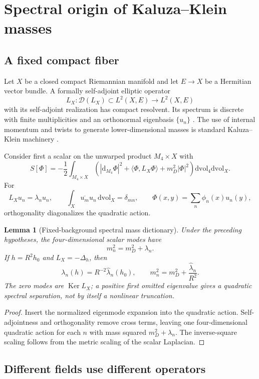 \documentclass[11pt]{article}
\newtheorem{lemma}[theorem]{Lemma}
\theoremstyle{definition}
\theoremstyle{remark}
\newcommand{\dd}{\mathrm d}
\newcommand{\cD}{\mathcal D}
\newcommand{\Ker}{\operatorname{Ker}}
\begin{document}
\section{Spectral origin of Kaluza--Klein masses}
\label{sec:spectrum}

\subsection{A fixed compact fiber}

Let \(X\) be a closed compact Riemannian manifold and let \(E\to X\) be a
Hermitian vector bundle.  A formally self-adjoint elliptic operator
\[
 L_X:\cD(L_X)\subset L^2(X,E)\longrightarrow L^2(X,E)
\]
with its self-adjoint realization has compact resolvent.  Its spectrum is
discrete with finite multiplicities and an orthonormal eigenbasis
\(\{u_n\}\) \cite{Chavel1984,ReedSimonIV}.  The use of internal momentum and
twists to generate lower-dimensional masses is standard Kaluza--Klein
machinery \cite{ScherkSchwarz1979}.

Consider first a scalar on the unwarped product \(M_4\times X\) with
\[
 S[\Phi]=-\frac12\int_{M_4\times X}
 \left(
 |\dd_{M_4}\Phi|^2
 +\langle\Phi,L_X\Phi\rangle
 +m_D^2|\Phi|^2
 \right)\dd\mathrm{vol}_{4}\dd\mathrm{vol}_{X}.
\]
For
\[
 L_Xu_n=\lambda_nu_n,\qquad
 \int_X\overline{u_m}u_n\,\dd\mathrm{vol}_{X}=\delta_{mn},
\qquad
 \Phi(x,y)=\sum_n\phi_n(x)u_n(y),
\]
orthogonality diagonalizes the quadratic action.

\begin{lemma}[Fixed-background spectral mass dictionary]
\label{lem:masses}
Under the preceding hypotheses, the four-dimensional scalar modes have
\[
 m_n^2=m_D^2+\lambda_n.
\]
If \(h=R^2h_0\) and \(L_X=-\Delta_h\), then
\[
 \lambda_n(h)=R^{-2}\widehat\lambda_n(h_0),
 \qquad
 m_n^2=m_D^2+\frac{\widehat\lambda_n}{R^2}.
\]
The zero modes are \(\Ker L_X\); a positive first omitted eigenvalue gives a
quadratic spectral separation, not by itself a nonlinear truncation.
\end{lemma}

\begin{proof}
Insert the normalized eigenmode expansion into the quadratic action.
Self-adjointness and orthogonality remove cross terms, leaving one
four-dimensional quadratic action for each \(n\) with mass squared
\(m_D^2+\lambda_n\).  The inverse-square scaling follows from the metric
scaling of the scalar Laplacian.
\end{proof}

\subsection{Different fields use different operators}
\end{document}
